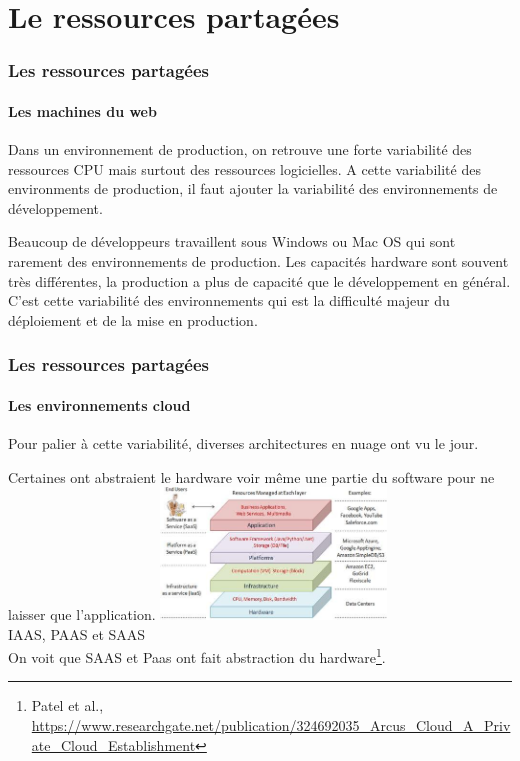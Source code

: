 \documentclass{beamer}
\begin{document}
    \section{Le ressources partagées}\label{sec:le-ressources-partagees}

    \begin{frame}
        \transdissolve
        \frametitle{Les ressources partagées}
        \framesubtitle{Les machines du web}
        Dans un environnement de production, on retrouve une forte variabilité des ressources CPU mais surtout des ressources logicielles.
        \bigbreak
        A cette variabilité des environments de production, il faut ajouter la variabilité des environnements de développement.

        Beaucoup de développeurs travaillent sous Windows ou Mac OS qui sont rarement des environnements de production.
        Les capacités hardware sont souvent très différentes, la production a plus de capacité que le développement en général.
        \bigbreak
        C'est cette variabilité des environnements qui est la difficulté majeur du déploiement et de la mise en production.
    \end{frame}

    \begin{frame}
        \transdissolve
        \frametitle{Les ressources partagées}
        \framesubtitle{Les environnements cloud}
        Pour palier à cette variabilité, diverses architectures en nuage ont vu le jour.

        Certaines ont abstraient le hardware voir même une partie du software pour ne laisser que l'application.
        \bigbreak
        \centering
        \includegraphics[width=6cm]{image/cloud-stacks.png} \\ IAAS, PAAS et SAAS\\
        \flushleft
        On voit que SAAS et Paas ont fait abstraction du hardware\footnote{\label{arcuscloud}Patel et al., \url{https://www.researchgate.net/publication/324692035_Arcus_Cloud_A_Private_Cloud_Establishment}}.
    \end{frame}
\end{document}
